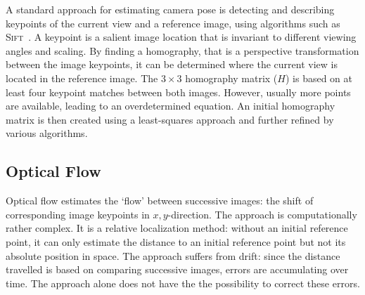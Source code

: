 A standard approach for estimating camera pose is detecting and
describing keypoints of the current view and a reference image, using
algorithms such as \textsc{Sift}~\cite{lowe1999object}. A
keypoint is a salient image location that is invariant to different
viewing angles and scaling. By finding a homography, that is a perspective transformation between the image keypoints, it can be determined where
the current view is located in the reference image. The $3 \times 3$
homography matrix ($H$) is based on at least four keypoint matches
between both images. However, usually more points are available,
leading to an overdetermined equation. An initial homography matrix is
then created using a least-squares approach and further refined by
various algorithms.



\subsection{Optical Flow}
\label{sec:opticalflow}

Optical flow estimates the ‘flow’ between successive images: the shift of corresponding image keypoints in $x,y$-direction.
The approach is computationally rather complex. It is a relative localization method: without an initial reference point, it can only estimate the distance to an initial reference point but not its absolute position in space. The approach suffers from drift: since the distance travelled is based on comparing successive images, errors are accumulating over time. The approach alone does not have the  the possibility to correct these errors.
